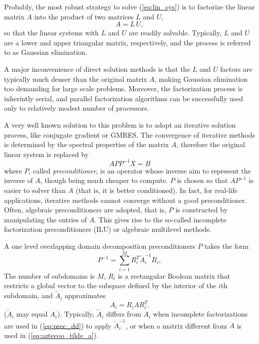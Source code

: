 \documentclass[10pt,relax]{SANDreport}
\begin{document}
Probably, the most robust strategy to solve (\ref{eq:lin_sys}) is to factorize
the linear matrix $A$ into the product of two matrices $L$ and $U$, 
\[
A = L \, U,
\]
so that the linear systems with $L$ and $U$ are readily solvable. Typically,
  $L$ and $U$ are a lower and upper triangular matrix, respectively, and the
  process is referred to as Gaussian elimination. 

A major inconvenience of direct solution methods is that the $L$ and $U$
factors are typically much denser than the original matrix $A$, making
Gaussian elimination too demanding for large scale problems. Moreover, the
factorization process is inherintly serial, and parallel factorization
algorithms can be successfully used only to relatively modest number of
processors.

A very well known solution to this problem is to adopt an iterative solution process, like conjugate gradient or GMRES. The convergence of
iterative methods is determined by the spectral properties of the matrix $A$,
  therefore the original linear system is replaced by
\[
A P P^{-1} X = B
\]
where $P$, called {\sl preconditioner}, is an operator whose inverse aim to
represent the inverse of $A$, though being much cheaper to compute.
$P$ is chosen so that $AP^{-1}$ is easier to solver than $A$ 
(that is, it is better conditioned). In fact, for real-life
applications, iterative methods cannot converge without a good preconditioner.
Often, algebraic preconditioners are adopted, that is, $P$ is constructed by
manipulating the entries of $A$. This gives rise to the so-called incomplete
factorization preconditioners (ILU) or algebraic multilevel methods.

A one level overlapping domain decomposition preconditioners $P$ takes the form
\begin{equation}
  \label{eq:prec_dd}
  P^{-1} = \sum_{i=1}^M R_i^T \tilde{A}_i^{-1} R_i,
\end{equation}
The number of subdomains is $M$,
$R_i$ is a rectangular Boolean matrix that restricts
a global vector to the subspace defined by the interior of the $i$th
subdomain, and $\tilde{A}_i$ approximates
\begin{equation}
  \label{eq:aztecoo_tilde_a}
  A_i = R_i A R_i^T .
\end{equation}
($\tilde{A}_i$ may equal $A_i$). Typically, $\tilde{A}_i$ differs
from $A_i$ when incomplete factorizations are used in (\ref{eq:prec_dd})
to apply $\tilde{A}_i^{-1}$, or when a matrix different from $A$ is used
in (\ref{eq:aztecoo_tilde_a}).
\end{document}
